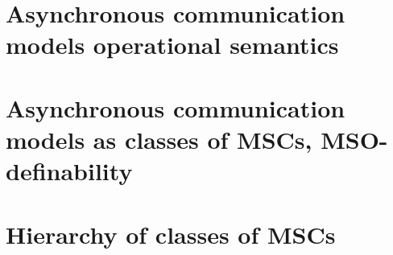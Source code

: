 \documentclass[acmsmall,review,anonymous,screen]{acmart}\settopmatter{printfolios=true,printccs=false,printacmref=true}
\begin{document}




% 


\section{Asynchronous communication models operational semantics}\label{sec:impl}



\section{Asynchronous communication models as classes of MSCs, MSO-definability}\label{sec:MSO}





%

\section{Hierarchy of classes of MSCs} \label{sec:hierarchy}
\end{document}
